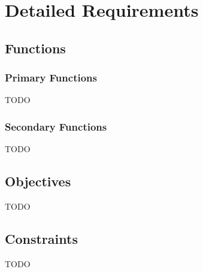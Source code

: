 \section{Detailed Requirements}
\subsection{Functions}
\subsubsection{Primary Functions}
TODO

\subsubsection{Secondary Functions}
TODO

\subsection{Objectives}
TODO

\subsection{Constraints}
TODO
